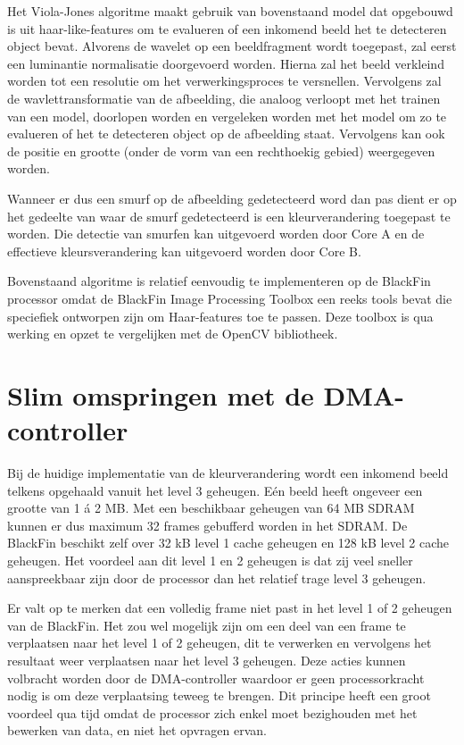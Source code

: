 	\par Het Viola-Jones algoritme maakt gebruik van bovenstaand model dat opgebouwd is uit haar-like-features om te evalueren of een inkomend beeld het te detecteren object bevat. Alvorens de wavelet op een beeldfragment wordt toegepast, zal eerst een luminantie normalisatie doorgevoerd worden. Hierna zal het beeld verkleind worden tot een resolutie om het verwerkingsproces te versnellen. Vervolgens zal de wavlettransformatie van de afbeelding, die analoog verloopt met het trainen van een model, doorlopen worden en vergeleken worden met het model om zo te evalueren of het te detecteren object op de afbeelding staat. Vervolgens kan ook de positie en grootte (onder de vorm van een rechthoekig gebied) weergegeven worden. 

	\par Wanneer er dus een smurf op de afbeelding gedetecteerd word dan pas dient er op het gedeelte van waar de smurf gedetecteerd is een kleurverandering toegepast te worden. Die detectie van smurfen kan uitgevoerd worden door Core A en de effectieve kleursverandering kan uitgevoerd worden door Core B.

	\par Bovenstaand algoritme is relatief eenvoudig te implementeren op de BlackFin processor omdat de BlackFin Image Processing Toolbox een reeks tools bevat die speciefiek ontworpen zijn om Haar-features toe te passen. Deze toolbox is qua werking en opzet te vergelijken met de OpenCV bibliotheek. 

\section{Slim omspringen met de DMA-controller}
\label{sec:dmacontroller}
	\par Bij de huidige implementatie van de kleurverandering wordt een inkomend beeld telkens opgehaald vanuit het level 3 geheugen. E\'en beeld heeft ongeveer een grootte van 1 \'a 2 MB. Met een beschikbaar geheugen van 64 MB SDRAM kunnen er dus maximum 32 frames gebufferd worden in het SDRAM. De BlackFin beschikt zelf over 32 kB level 1 cache geheugen en 128 kB level 2 cache geheugen. Het voordeel aan dit level 1 en 2 geheugen is dat zij veel sneller aanspreekbaar zijn door de processor dan het relatief trage level 3 geheugen. 

	\par Er valt op te merken dat een volledig frame niet past in het level 1 of 2 geheugen van de BlackFin. Het zou wel mogelijk zijn om een deel van een frame te verplaatsen naar het level 1 of 2 geheugen, dit te verwerken en vervolgens het resultaat weer verplaatsen naar het level 3 geheugen. Deze acties kunnen volbracht worden door de DMA-controller waardoor er geen processorkracht nodig is om deze verplaatsing teweeg te brengen. Dit principe heeft een groot voordeel qua tijd omdat de processor zich enkel moet bezighouden met het bewerken van data, en niet het opvragen ervan. 

